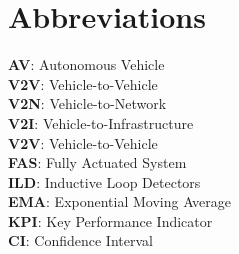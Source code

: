 \section*{Abbreviations}

\textbf{AV}: Autonomous Vehicle \\
\textbf{V2V}: Vehicle-to-Vehicle \\
\textbf{V2N}: Vehicle-to-Network \\
\textbf{V2I}: Vehicle-to-Infrastructure\\
\textbf{V2V}: Vehicle-to-Vehicle\\
\textbf{FAS}: Fully Actuated System\\
\textbf{ILD}: Inductive Loop Detectors\\
\textbf{EMA}: Exponential Moving Average\\
\textbf{KPI}: Key Performance Indicator\\
\textbf{CI}: Confidence Interval\\



